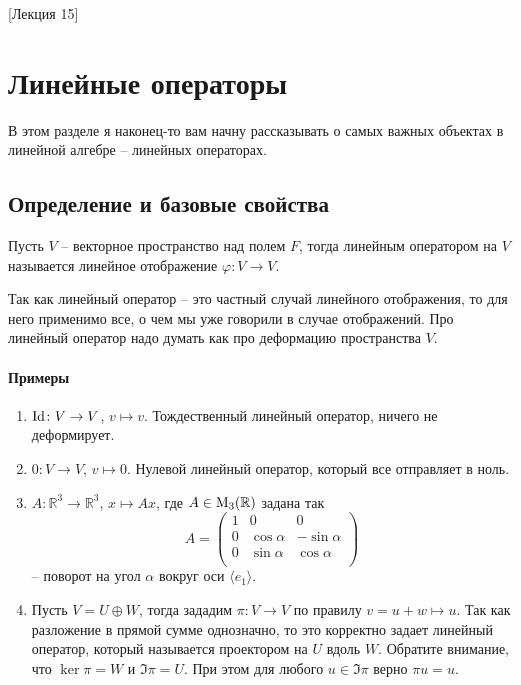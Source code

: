 [Лекция 15]


\newpage
\section{Линейные операторы}

В этом разделе я наконец-то вам начну рассказывать о самых важных объектах в линейной алгебре -- линейных операторах.

\subsection{Определение и базовые свойства}
\label{section::LinearOpDef}

\begin{definition}
Пусть $V$ -- векторное пространство над полем $F$, тогда линейным оператором на $V$ называется линейное отображение $\varphi \colon V\to V$.
\end{definition}

Так как линейный оператор -- это частный случай линейного отображения, то для него применимо все, о чем мы уже говорили в случае отображений.
Про линейный оператор надо думать как про деформацию пространства $V$.

\paragraph{Примеры}

\begin{enumerate}
\item $\operatorname{Id}\colon V\to V$, $v\mapsto v$.
Тождественный линейный оператор, ничего не деформирует.

\item $0\colon V\to V$, $v \mapsto 0$.
Нулевой линейный оператор, который все отправляет в ноль.

\item $A\colon \mathbb R^3 \to \mathbb R^3$, $x\mapsto Ax$, где $A\in \operatorname{M}_{3}(\mathbb R)$ задана так
\[
A = 
\begin{pmatrix}
{1}&{0}&{0}\\
{0}&{\cos \alpha}&{-\sin \alpha}\\
{0}&{\sin \alpha}&{\cos \alpha}\\
\end{pmatrix}
\]
-- поворот на угол $\alpha$ вокруг оси $\langle e_1\rangle$.

\item Пусть $V = U\oplus W$, тогда зададим $\pi\colon V\to V$ по правилу $v = u + w \mapsto u$.
Так как разложение в прямой сумме однозначно, то это корректно задает линейный оператор, который называется проектором на $U$ вдоль $W$.
Обратите внимание, что $\ker \pi = W$ и $\Im \pi = U$.
При этом для любого $u\in \Im\pi$ верно $\pi u = u$.
\end{enumerate}

